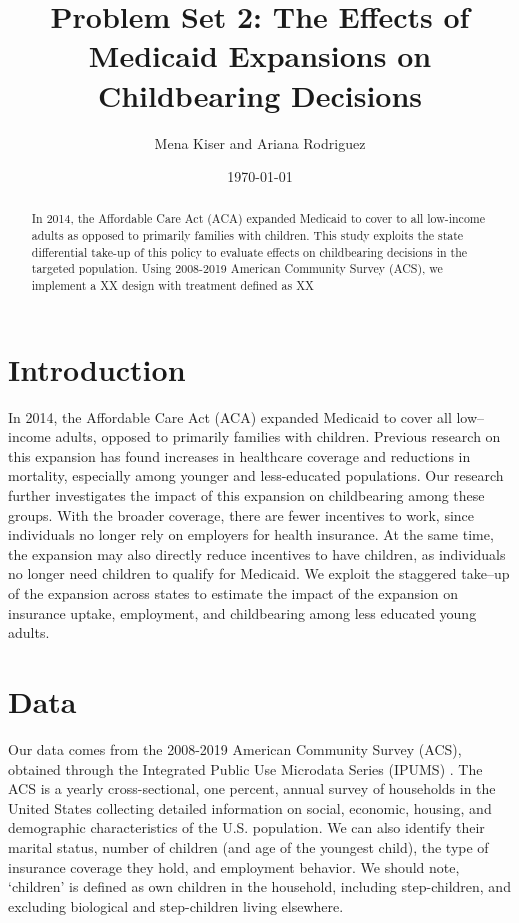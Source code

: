 \documentclass{article}
\title{Problem Set 2: The Effects of Medicaid Expansions on Childbearing Decisions}
\author{Mena Kiser and Ariana Rodriguez}
\date{\today}
\begin{document}
\maketitle

\begin{abstract}
    In 2014, the Affordable Care Act (ACA) expanded Medicaid to cover to all low-income adults as opposed to primarily families with children. This study exploits the state differential take-up of this policy to evaluate effects on childbearing decisions in the targeted population. Using 2008-2019 American Community Survey (ACS), we implement a XX design with treatment defined as XX
\end{abstract}

\section{Introduction}
In 2014, the Affordable Care Act (ACA) expanded Medicaid to cover all low–income adults, opposed to primarily families with children. Previous research on this expansion has found increases in healthcare coverage and reductions in mortality, especially among younger and less-educated populations. Our research further investigates the impact of this expansion on childbearing among these groups. With the broader coverage, there are fewer incentives to work, since individuals no longer rely on employers for health insurance. At the same time, the expansion may also directly reduce incentives to have children, as individuals no longer need children to qualify for Medicaid. We exploit the staggered take–up of the expansion across states to estimate the impact of the expansion on insurance uptake, employment, and childbearing among less educated young adults.


\section{Data }
Our data comes from the 2008-2019 American Community Survey (ACS), obtained through the Integrated Public Use Microdata Series (IPUMS) \citep{data:acs}. The ACS is a yearly cross-sectional, one percent, annual survey of households in the United States collecting detailed information on social, economic, housing, and demographic characteristics of the U.S. population. We can also identify their marital status, number of children (and age of the youngest child), the type of insurance coverage they hold, and employment behavior. We should note, `children' is defined as own children in the household, including step-children, and excluding biological and step-children living elsewhere.
\end{document}
